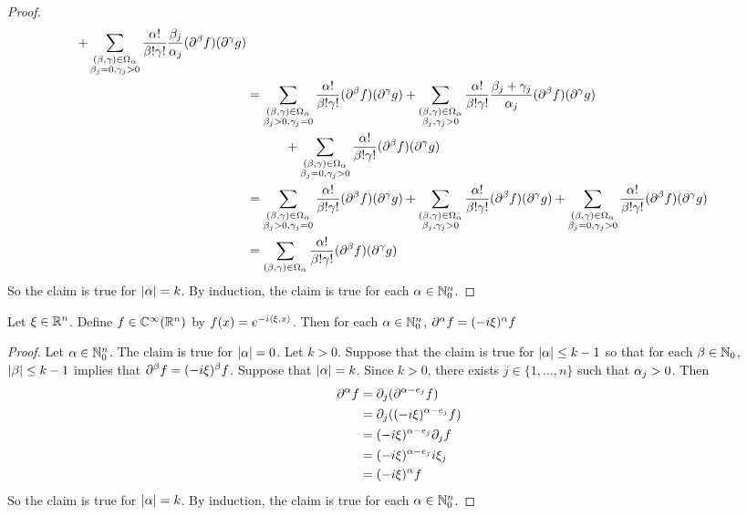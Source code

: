 \documentclass{book}
\begin{document}
\begin{proof}
\begin{align*}
			+ \sum_{\substack{(\beta, \gamma) \in \Omega_{\alpha} \\ \beta_j = 0, \gamma_j > 0}} \frac{\alpha!}{\beta !\gamma !} \frac{\beta_j}{\alpha_j}(\partial^{\beta} f) (\partial^{\gamma}g)\\ 
			& = \sum_{\substack{(\beta, \gamma) \in \Omega_{\alpha} \\ \beta_j > 0, \gamma_j = 0}} \frac{\alpha!}{\beta !\gamma !} (\partial^{\beta} f) (\partial^{\gamma}g) 
			+ \sum_{\substack{(\beta, \gamma) \in \Omega_{\alpha} \\ \beta_j, \gamma_j > 0}} \frac{\alpha!}{\beta !\gamma !} \frac{\beta_j + \gamma_j}{\alpha_j}(\partial^{\beta} f) (\partial^{\gamma}g) \\
			& \quad \quad \quad + \sum_{\substack{(\beta, \gamma) \in \Omega_{\alpha} \\ \beta_j = 0, \gamma_j > 0}} \frac{\alpha!}{\beta !\gamma !} (\partial^{\beta} f) (\partial^{\gamma}g)\\ 
			& = \sum_{\substack{(\beta, \gamma) \in \Omega_{\alpha} \\ \beta_j > 0, \gamma_j = 0}} \frac{\alpha!}{\beta !\gamma !} (\partial^{\beta} f) (\partial^{\gamma}g) 
			+ \sum_{\substack{(\beta, \gamma) \in \Omega_{\alpha} \\ \beta_j, \gamma_j > 0}} \frac{\alpha!}{\beta !\gamma !} (\partial^{\beta} f) (\partial^{\gamma}g) +  \sum_{\substack{(\beta, \gamma) \in \Omega_{\alpha} \\ \beta_j = 0, \gamma_j > 0}} \frac{\alpha!}{\beta !\gamma !} (\partial^{\beta} f) (\partial^{\gamma}g)\\ 
			& = \sum_{(\beta, \gamma) \in \Omega_{\alpha}} \frac{\alpha!}{\beta !\gamma !} (\partial^{\beta} f) (\partial^{\gamma}g) 
		\end{align*}
		So the claim is true for $|\alpha| = k$. By induction, the claim is true for each $\alpha \in \mathbb{N}_0^n$.
	\end{proof}

	\begin{ex} 
		Let $\xi \in \mathbb{R}^n$. Define $f \in \mathbb{C}^{\infty}(\mathbb{R}^n)$ by $f(x) = e^{-i \langle \xi , x \rangle}$. Then for each $\alpha \in \mathbb{N}_{0}^n$, $\partial^{\alpha} f = (-i \xi)^{\alpha} f$
	\end{ex}

	\begin{proof}
		Let $\alpha \in \mathbb{N}_0^n$. The claim is true for $|\alpha| = 0$. Let $k > 0$. Suppose that the claim is true for $|\alpha| \leq k-1$ so that for each $\beta \in \mathbb{N}_0$, $|\beta| \leq k-1$ implies that $\partial^{\beta} f = (-i\xi)^{\beta} f$. Suppose that $|\alpha| = k$. Since $k > 0$, there exists $j \in \{1, \ldots, n\}$ such that $\alpha_j >0$. Then
		\begin{align*}
			\partial^{\alpha} f
			& = \partial_j (\partial^{\alpha - e_j} f) \\
			& = \partial_j( (-i \xi)^{\alpha - e_j} f) \\
			& = (-i \xi)^{\alpha - e_j} \partial_j f \\
			& = (-i \xi)^{\alpha - e_j} i \xi_j \\
			& = (-i \xi)^{\alpha} f
		\end{align*}  
		So the claim is true for $|\alpha| = k$. By induction, the claim is true for each $\alpha \in \mathbb{N}_0^n$.
	\end{proof}
	
\end{document}
